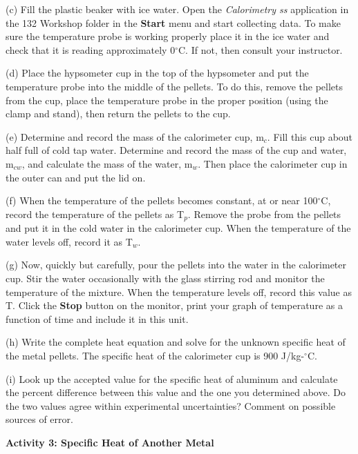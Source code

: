 (c) Fill the plastic beaker with ice water. Open the \textit{Calorimetry ss}
application in the 132 Workshop folder in the {\bf Start} menu and start
collecting data. To make sure the temperature probe is working 
properly place it in the ice water and
check that it is reading approximately 0\( ^{\circ } \)C. If not,
then consult your instructor.

(d) Place the hypsometer cup in the top of the hypsometer and put the temperature probe into the middle of the pellets.  To do this, remove the pellets from the cup, place the temperature probe in the proper position (using the clamp and stand), then return the pellets to the cup.

(e) Determine and record the mass of the calorimeter cup, m\( _{c} \).
Fill this cup about half full of cold tap water. Determine and record
the mass of the cup and water, m\( _{cw} \), and calculate the mass
of the water, m\( _{w} \). Then place the calorimeter cup in the outer
can and put the lid on.
\vspace{15mm}

(f) When the temperature of the pellets becomes constant, at or near
100\( ^{\circ } \)C, record the temperature of the pellets as T\( _{p} \).
Remove the probe from the pellets and put it in the cold water in the calorimeter cup. When the temperature of the water levels off, record it as T\( _{w} \).
\vspace{15mm}

(g) Now, quickly but carefully, pour the pellets into the water in
the calorimeter cup. Stir the water occasionally with the glass stirring rod and
monitor the temperature of the mixture. When the temperature levels off, record
this value as T. Click the {\bf Stop} button on the monitor, print your graph of temperature as a function of time and include it in this unit.
\vspace{15mm}

(h) Write the complete heat equation and solve for the unknown specific
heat of the metal pellets.
The specific heat of the calorimeter cup is 900 J/kg-\( ^{\circ } \)C.
\vspace{2in}

(i) Look up the accepted value for the specific heat of aluminum and
calculate the percent difference between this value and the one you
determined above. Do the two values agree within experimental uncertainties?
Comment on possible sources of error.
\vspace{20mm}

\textbf{Activity 3: Specific Heat of Another Metal}

